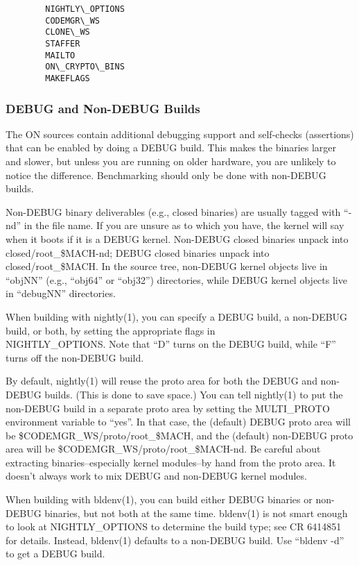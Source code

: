 \documentclass{article}
\begin{document}
\begin{verbatim}
        NIGHTLY\_OPTIONS
        CODEMGR\_WS
        CLONE\_WS
        STAFFER
        MAILTO
        ON\_CRYPTO\_BINS
        MAKEFLAGS
\end{verbatim}

\subsubsection*{DEBUG and Non-DEBUG Builds}

The ON sources contain additional debugging support and self-checks (assertions)
that can be enabled by doing a DEBUG build.  This makes the binaries larger and
slower, but unless you are running on older hardware, you are unlikely to notice
the difference.  Benchmarking should only be done with non-DEBUG builds.

Non-DEBUG binary deliverables (e.g., closed binaries) are usually tagged with
``-nd'' in the file name.  If you are unsure as to which you have, the kernel
will say when it boots if it is a DEBUG kernel.  Non-DEBUG closed binaries
unpack into closed/root\_\$MACH-nd; DEBUG closed binaries unpack into
closed/root\_\$MACH.  In the source tree, non-DEBUG kernel objects live in
``objNN'' (e.g., ``obj64'' or ``obj32'') directories, while DEBUG kernel objects
live in ``debugNN'' directories.

When building with nightly(1), you can specify a DEBUG build, a non-DEBUG build,
or both, by setting the appropriate flags in \\NIGHTLY\_OPTIONS. Note that ``D''
turns on the DEBUG build, while ``F'' turns off the non-DEBUG build.

By default, nightly(1) will reuse the proto area for both the DEBUG and
non-DEBUG builds.  (This is done to save space.)  You can tell nightly(1) to put
the non-DEBUG build in a separate proto area by setting the MULTI\_PROTO
environment variable to ``yes''.  In that case, the (default) DEBUG proto area
will be \${CODEMGR\_WS}/proto/root\_\${MACH}, and the (default) non-DEBUG proto
area will be \${CODEMGR\_WS}/proto/root\_\${MACH}-nd.  Be careful about
extracting binaries--especially kernel modules--by hand from the proto area.  It
doesn't always work to mix DEBUG and non-DEBUG kernel modules.

When building with bldenv(1), you can build either DEBUG binaries or non-DEBUG
binaries, but not both at the same time.  bldenv(1) is not smart enough to look
at NIGHTLY\_OPTIONS to determine the build type; see CR 6414851 for details.
Instead, bldenv(1) defaults to a non-DEBUG build.  Use ``bldenv -d'' to get a
DEBUG build.
\end{document}
